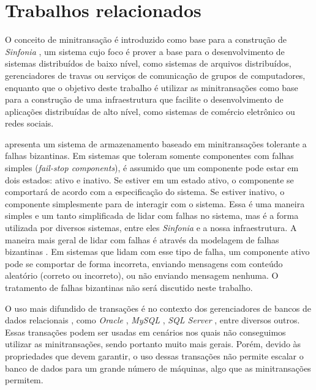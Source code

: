 \documentclass[11pt,twoside,a4paper]{book}
\begin{document}

\section{Trabalhos relacionados}
\label{sec:trabalhos_relacionados}
O conceito de minitransação é introduzido como base para a construção de \emph{Sinfonia} \cite{sinfonia}, um sistema cujo foco é prover a base para o desenvolvimento de sistemas distribuídos de baixo nível, como sistemas de arquivos distribuídos, gerenciadores de travas ou serviços de comunicação de grupos de computadores, enquanto que o objetivo deste trabalho é utilizar as minitransações como base para a construção de uma infraestrutura que facilite o desenvolvimento de aplicações distribuídas de alto nível, como sistemas de comércio eletrônico ou redes sociais.

\cite{padilha} apresenta um sistema de armazenamento baseado em minitransações tolerante a falhas bizantinas. Em sistemas que toleram somente componentes com falhas simples (\emph{fail-stop components}), é assumido que um componente pode estar em dois estados: ativo e inativo. Se estiver em um estado ativo, o componente se comportará de acordo com a especificação do sistema. Se estiver inativo, o componente simplesmente para de interagir com o sistema. Essa é uma maneira simples e um tanto simplificada de lidar com falhas no sistema, mas é a forma utilizada por diversos sistemas, entre eles \emph{Sinfonia} e a nossa infraestrutura. A maneira mais geral de lidar com falhas é através da modelagem de falhas bizantinas \cite{byzantine}. Em sistemas que lidam com esse tipo de falha, um componente ativo pode se comportar de forma incorreta, enviando mensagens com conteúdo aleatório (correto ou incorreto), ou não enviando mensagem nenhuma. O tratamento de falhas bizantinas não será discutido neste trabalho.

O uso mais difundido de transações é no contexto dos gerenciadores de bancos de dados relacionais \cite{vaca}, como \emph{Oracle} \cite{oracle}, \emph{MySQL} \cite{mysql}, \emph{SQL Server} \cite{sqlserver}, entre diversos outros. Essas transações podem ser usadas em cenários nos quais não conseguimos utilizar as minitransações, sendo portanto muito mais gerais. Porém, devido às propriedades que devem garantir, o uso dessas transações não permite escalar o banco de dados para um grande número de máquinas, algo que as minitransações permitem.
\end{document}
